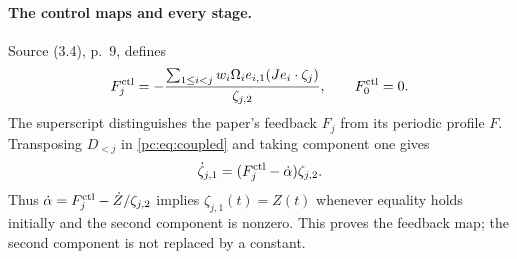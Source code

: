 \paragraph{The control maps and every stage.}
Source (3.4), p.~9, defines
\begin{equation}\label{pc:eq:feedback}
 F_j^{\rm ctl}=-\frac{\sum_{1\le i<j}w_i\Omega_i e_{i,1}(Je_i\cdot\zeta_j)}{\zeta_{j,2}},\qquad F_0^{\rm ctl}=0.
\end{equation}
The superscript distinguishes the paper's feedback $F_j$ from its periodic profile $F$. Transposing $D_{<j}$ in \eqref{pc:eq:coupled} and taking component one gives
\[
 \dot\zeta_{j,1}=(F_j^{\rm ctl}-\dot\alpha)\zeta_{j,2}.
\]
Thus $\dot\alpha=F_j^{\rm ctl}-\dot Z/\zeta_{j,2}$ implies $\zeta_{j,1}(t)=Z(t)$ whenever equality holds initially and the second component is nonzero. This proves the feedback map; the second component is not replaced by a constant.

